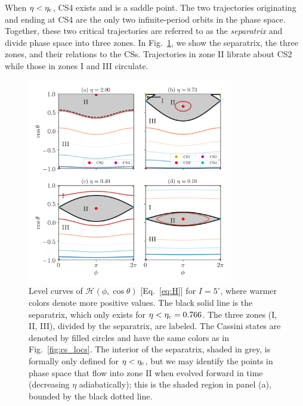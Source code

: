 \documentclass[twocolumn,twocolappendix]{aastex63}
\newcommand*{\p}[1]{\left(#1\right)}
\begin{document}
When $\eta < \eta_{\rm c}$, CS4 exists and is a saddle point. The two
trajectories originating and ending at CS4 are the only two infinite-period
orbits in the phase space. Together, these two critical trajectories are
referred to as the \emph{separatrix} and divide phase space into three zones. In
Fig.~\ref{fig:eq_1contours}, we show the separatrix, the three zones, and their
relations to the CSs. Trajectories in zone II librate about CS2 while those in
zones I and III circulate.
\begin{figure}
    \centering
    \includegraphics[width=0.8\textwidth]{plots_diskdisp/1contours_flip.png}
    \caption{Level curves of $\mathcal{H}\p{\phi, \cos \theta}$
    [Eq.~\eqref{eq:H}] \textcolor{Corr}{for $I = 5^\circ$}, where warmer colors
    denote more positive values. The black solid line is the separatrix, which
    only exists for $\eta < \eta_{\rm c} = 0.766$. The three zones (I, II, III),
    divided by the separatrix, are labeled. The Cassini states are denoted by
    filled circles and have the same colors as in Fig.~\ref{fig:cs_locs}. The
    interior of the separatrix, shaded in grey, is formally only defined for
    $\eta < \eta_{\rm c}$, but we may identify the points in phase space that
    flow into zone II when evolved forward in time (decreasing $\eta$
    adiabatically); this is the shaded region in panel (a), bounded by the black
    dotted line.}\label{fig:eq_1contours}
\end{figure}
\end{document}
